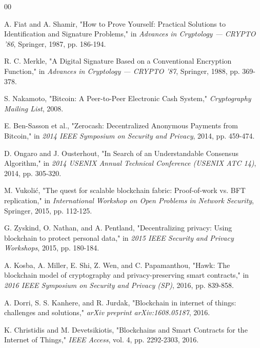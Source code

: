 \documentclass[conference]{IEEEtran}
\begin{document}
\begin{thebibliography}{00}

A. Fiat and A. Shamir, 
"How to Prove Yourself: Practical Solutions to Identification and Signature Problems," 
in \textit{Advances in Cryptology — CRYPTO ’86}, Springer, 1987, pp. 186-194.

R. C. Merkle, 
"A Digital Signature Based on a Conventional Encryption Function," 
in \textit{Advances in Cryptology — CRYPTO ’87}, Springer, 1988, pp. 369-378.

S. Nakamoto, 
"Bitcoin: A Peer-to-Peer Electronic Cash System," 
\textit{Cryptography Mailing List}, 2008.

E. Ben-Sasson et al., 
"Zerocash: Decentralized Anonymous Payments from Bitcoin," 
in \textit{2014 IEEE Symposium on Security and Privacy}, 2014, pp. 459-474.

D. Ongaro and J. Ousterhout, 
"In Search of an Understandable Consensus Algorithm," 
in \textit{2014 USENIX Annual Technical Conference (USENIX ATC 14)}, 2014, pp. 305-320.

M. Vukolić, 
"The quest for scalable blockchain fabric: Proof-of-work vs. BFT replication," 
in \textit{International Workshop on Open Problems in Network Security}, Springer, 2015, pp. 112-125.


G. Zyskind, O. Nathan, and A. Pentland, 
"Decentralizing privacy: Using blockchain to protect personal data," 
in \textit{2015 IEEE Security and Privacy Workshops}, 2015, pp. 180-184.

A. Kosba, A. Miller, E. Shi, Z. Wen, and C. Papamanthou, 
"Hawk: The blockchain model of cryptography and privacy-preserving smart contracts," 
in \textit{2016 IEEE Symposium on Security and Privacy (SP)}, 2016, pp. 839-858.


A. Dorri, S. S. Kanhere, and R. Jurdak, 
"Blockchain in internet of things: challenges and solutions," 
\textit{arXiv preprint arXiv:1608.05187}, 2016.

K. Christidis and M. Devetsikiotis, 
"Blockchains and Smart Contracts for the Internet of Things," 
\textit{IEEE Access}, vol. 4, pp. 2292-2303, 2016.


\end{thebibliography}
\end{document}
